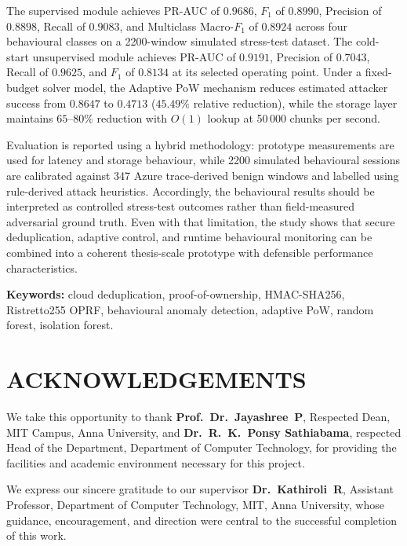 \documentclass[12pt,a4paper,oneside]{report}
\begin{document}
The supervised module achieves PR-AUC of $0.9686$, $F_1$ of $0.8990$, Precision of $0.8898$, Recall of $0.9083$, and Multiclass Macro-$F_1$ of $0.8924$ across four behavioural classes on a 2200-window simulated stress-test dataset.
The cold-start unsupervised module achieves PR-AUC of $0.9191$, Precision of $0.7043$, Recall of $0.9625$, and $F_1$ of $0.8134$ at its selected operating point.
Under a fixed-budget solver model, the Adaptive PoW mechanism reduces estimated attacker success from $0.8647$ to $0.4713$ ($45.49\%$ relative reduction), while the storage layer maintains $65$--$80\%$ reduction with $O(1)$ lookup at 50\,000 chunks per second.

Evaluation is reported using a hybrid methodology: prototype measurements are used for latency and storage behaviour, while 2200 simulated behavioural sessions are calibrated against 347 Azure trace-derived benign windows and labelled using rule-derived attack heuristics.
Accordingly, the behavioural results should be interpreted as controlled stress-test outcomes rather than field-measured adversarial ground truth.
Even with that limitation, the study shows that secure deduplication, adaptive control, and runtime behavioural monitoring can be combined into a coherent thesis-scale prototype with defensible performance characteristics.

\vspace{6pt}
\noindent\textbf{Keywords:} cloud deduplication, proof-of-ownership, HMAC-SHA256, Ristretto255 OPRF, behavioural anomaly detection, adaptive PoW, random forest, isolation forest.

\chapter*{ACKNOWLEDGEMENTS}

We take this opportunity to thank \textbf{Prof.~Dr.~Jayashree~P}, Respected Dean, MIT Campus, Anna University, and \textbf{Dr.~R.~K.~Ponsy Sathiabama}, respected Head of the Department, Department of Computer Technology, for providing the facilities and academic environment necessary for this project.

We express our sincere gratitude to our supervisor \textbf{Dr.~Kathiroli~R}, Assistant Professor, Department of Computer Technology, MIT, Anna University, whose guidance, encouragement, and direction were central to the successful completion of this work.
\end{document}
